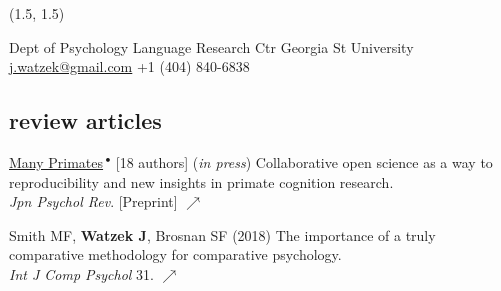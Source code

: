 \documentclass[]{friggeri-cv}
\begin{document}
\pagestyle{fancy}

\renewenvironment{aside}{%
  \let\oldsection\section
  \renewcommand{\section}[1]{
    \par\vspace{\baselineskip}{\Large\headingfont\color{headercolor} ##1}
  }
  \begin{textblock}{3.6}(1.5, 1.5)
  \begin{flushright}
  \obeycr
}{%
  \restorecr
  \end{flushright}
  \end{textblock}
  \let\section\oldsection
}


\begin{aside}
  \section{{\normalfont julia}watzek}
    Dept of Psychology
    Language Research Ctr
    Georgia St University
    ~
    \href{mailto:j.watzek@gmail.com}{j.watzek@gmail.com}
    +1 (404) 840-6838
\end{aside}


\subsection{review articles}

\begin{enumerate}[resume, label={[\,\arabic*\,]}]
  \item \ul{Many Primates}\,${}^\bullet$ [18 authors] (\emph{in press}) Collaborative open science as a way to reproducibility and new insights in primate cognition research. \\\emph{Jpn Psychol Rev}. [Preprint] \href{https://doi.org/10.31234/osf.io/8w7zd}{\small $\nearrow$}
  \item {Smith MF, \textbf{Watzek J}, Brosnan SF (2018) The importance of a truly comparative methodology for comparative psychology. \\\emph{Int J Comp Psychol} 31. \href{https://escholarship.org/uc/item/6x91j98x}{\small $\nearrow$}}
\end{enumerate}
\end{document}

